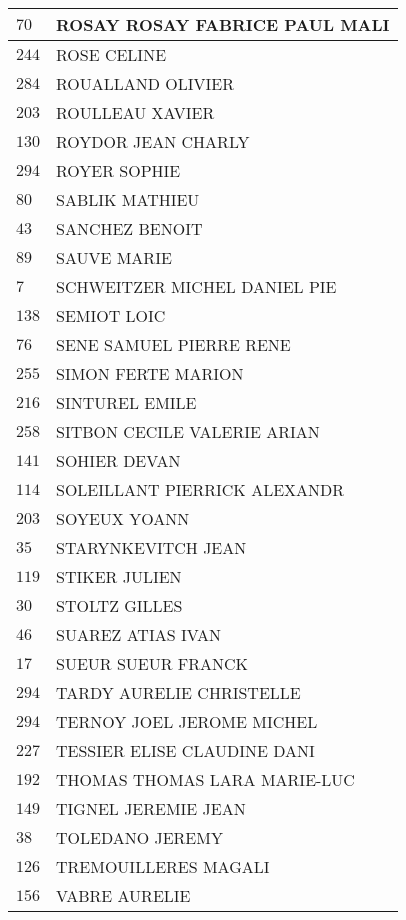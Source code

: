 \begin{xltabular}{\linewidth}{|l|X|}
    \hline
    $70$ & ROSAY ROSAY FABRICE PAUL MALI \\
    \hline
    $244$ & ROSE CELINE \\
    \hline
    $284$ & ROUALLAND OLIVIER \\
    \hline
    $203$ & ROULLEAU XAVIER \\
    \hline
    $130$ & ROYDOR JEAN CHARLY \\
    \hline
    $294$ & ROYER SOPHIE \\
    \hline
    $80$ & SABLIK MATHIEU \\
    \hline
    $43$ & SANCHEZ BENOIT \\
    \hline
    $89$ & SAUVE MARIE \\
    \hline
    $7$ & SCHWEITZER MICHEL DANIEL PIE \\
    \hline
    $138$ & SEMIOT LOIC \\
    \hline
    $76$ & SENE SAMUEL PIERRE RENE \\
    \hline
    $255$ & SIMON FERTE MARION \\
    \hline
    $216$ & SINTUREL EMILE \\
    \hline
    $258$ & SITBON CECILE VALERIE ARIAN \\
    \hline
    $141$ & SOHIER DEVAN \\
    \hline
    $114$ & SOLEILLANT PIERRICK ALEXANDR \\
    \hline
    $203$ & SOYEUX YOANN \\
    \hline
    $35$ & STARYNKEVITCH JEAN \\
    \hline
    $119$ & STIKER JULIEN \\
    \hline
    $30$ & STOLTZ GILLES \\
    \hline
    $46$ & SUAREZ ATIAS IVAN \\
    \hline
    $17$ & SUEUR SUEUR FRANCK \\
    \hline
    $294$ & TARDY AURELIE CHRISTELLE \\
    \hline
    $294$ & TERNOY JOEL JEROME MICHEL \\
    \hline
    $227$ & TESSIER ELISE CLAUDINE DANI \\
    \hline
    $192$ & THOMAS THOMAS LARA MARIE-LUC \\
    \hline
    $149$ & TIGNEL JEREMIE JEAN \\
    \hline
    $38$ & TOLEDANO JEREMY \\
    \hline
    $126$ & TREMOUILLERES MAGALI \\
    \hline
    $156$ & VABRE AURELIE \\

\end{xltabular}
